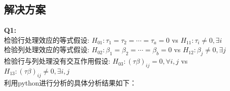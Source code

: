 \documentclass[11pt]{ctexart}
\begin{document}
    \hypertarget{ux89e3ux51b3ux65b9ux6848}{%
\subsection{解决方案}\label{ux89e3ux51b3ux65b9ux6848}}

\textbf{Q1:}\\
检验行处理效应的等式假设: \(H_{01}:\tau_1=\tau_2=\cdots=\tau_a=0\) vs
\(H_{11}:\tau_i \neq 0, \exists i\)\\
检验列处理效应的等式假设: \(H_{02}:\beta_1=\beta_2=\cdots=\beta_b=0\) vs
\(H_{12}:\beta_j \neq 0, \exists j\)\\
检验行与列处理没有交互作用假设:
\(H_{03}:(\tau\beta)_{ij}=0, \forall i,j\) vs
\(H_{13}:(\tau\beta)_{ij} \neq 0, \exists i,j\)\\
利用python进行分析的具体分析结果如下：
\end{document}
